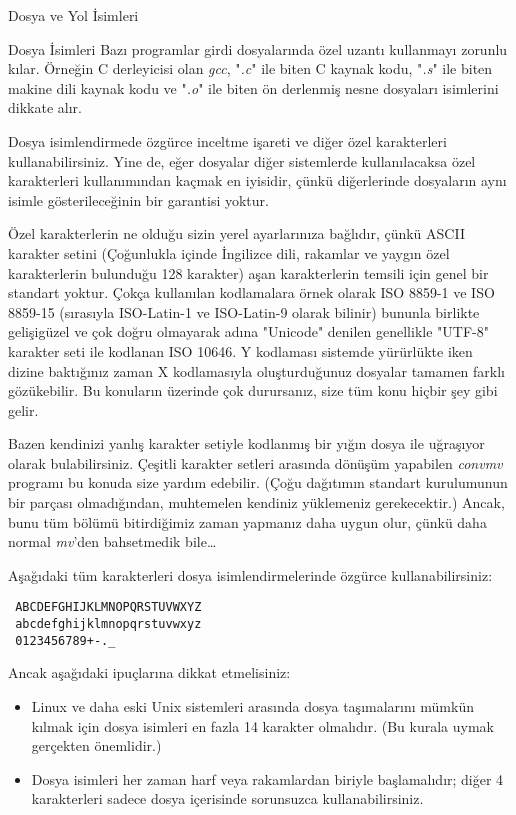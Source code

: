 \begin{section}{Dosya ve Yol İsimleri}
\begin{subsection}{Dosya İsimleri}
Bazı programlar girdi dosyalarında özel uzantı kullanmayı zorunlu kılar. Örneğin C derleyicisi olan \emph{gcc}, "\emph{.c}" ile biten C kaynak kodu, "\emph{.s}" ile biten makine dili kaynak kodu ve "\emph{.o}" ile biten ön derlenmiş nesne dosyaları isimlerini dikkate alır.
	
Dosya isimlendirmede özgürce inceltme işareti ve diğer özel karakterleri kullanabilirsiniz. Yine de, eğer dosyalar diğer sistemlerde kullanılacaksa özel karakterleri kullanımından kaçmak en iyisidir, çünkü diğerlerinde dosyaların aynı isimle gösterileceğinin bir garantisi yoktur.
	
Özel karakterlerin ne olduğu sizin yerel ayarlarınıza bağlıdır, çünkü ASCII karakter setini (Çoğunlukla içinde İngilizce dili, rakamlar ve yaygın özel karakterlerin bulunduğu 128 karakter) aşan karakterlerin temsili için genel bir standart yoktur. Çokça kullanılan kodlamalara örnek olarak ISO 8859-1 ve ISO 8859-15 (sırasıyla ISO-Latin-1 ve ISO-Latin-9 olarak bilinir) bununla birlikte gelişigüzel ve çok doğru olmayarak adına "Unicode" denilen genellikle "UTF-8" karakter seti ile kodlanan ISO 10646. Y kodlaması sistemde yürürlükte iken dizine baktığınız zaman X kodlamasıyla oluşturduğunuz dosyalar tamamen farklı gözükebilir. Bu konuların üzerinde çok durursanız, size tüm konu hiçbir şey gibi gelir.
	
Bazen kendinizi yanlış karakter setiyle kodlanmış bir yığın dosya ile uğraşıyor olarak bulabilirsiniz. Çeşitli karakter setleri arasında dönüşüm yapabilen \emph{convmv} programı bu konuda size yardım edebilir. (Çoğu dağıtımın standart kurulumunun bir parçası olmadığından, muhtemelen kendiniz yüklemeniz gerekecektir.) Ancak, bunu tüm bölümü bitirdiğimiz zaman yapmanız daha uygun olur, çünkü daha normal \emph{mv}'den bahsetmedik bile\ldots
	
Aşağıdaki tüm karakterleri dosya isimlendirmelerinde özgürce kullanabilirsiniz:
\begin{verbatim}
 ABCDEFGHIJKLMNOPQRSTUVWXYZ
 abcdefghijklmnopqrstuvwxyz
 0123456789+-._
\end{verbatim}

Ancak aşağıdaki ipuçlarına dikkat etmelisiniz:
\begin{itemize}
\item Linux ve daha eski Unix sistemleri arasında dosya taşımalarını mümkün kılmak için dosya isimleri en fazla 14 karakter olmalıdır. (Bu kurala uymak gerçekten önemlidir.)
\item Dosya isimleri her zaman harf veya rakamlardan biriyle başlamalıdır; diğer 4 karakterleri sadece dosya içerisinde sorunsuzca kullanabilirsiniz.
\end{itemize}


\end{subsection}
\end{section}
